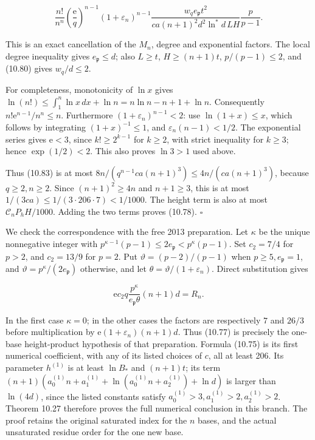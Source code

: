 \documentclass[
  11pt,
  a4paper,
]{article}
\begin{document}
\[
\frac{n!}{n^n}\left(\frac{\mathrm e}{q}\right)^{n-1}
(1+\varepsilon_n)^{n-1}
\frac{w_q e_{\mathfrak p}t^2}
{c a(n+1)^2d^2\ln^*d\,LH}\frac p{p-1}.
\tag{10.83}
\]

This is an exact cancellation of the \(M_n\), degree and exponential
factors. The local degree inequality gives \(e_{\mathfrak p}\le d\);
also \(L\ge t\), \(H\ge(n+1)t\), \(p/(p-1)\le2\), and (10.80) gives
\(w_q/d\le2\).

For completeness, monotonicity of \(\ln x\) gives
\(\ln(n!)\le\int_1^n\ln x\,dx+\ln n
=n\ln n-n+1+\ln n\). Consequently \(n!\mathrm e^{n-1}/n^n\le n\).
Furthermore \((1+\varepsilon_n)^{n-1}<2\): use \(\ln(1+x)\le x\), which
follows by integrating \((1+x)^{-1}\le1\), and
\(\varepsilon_n(n-1)<1/2\). The exponential series gives
\(\mathrm e<3\), since \(k!\ge2^{k-1}\) for \(k\ge2\), with strict
inequality for \(k\ge3\); hence \(\exp(1/2)<2\). This also proves
\(\ln3>1\) used above.

Thus (10.83) is at most \(8n/(q^{n-1}c a(n+1)^3)\le4n/(c a(n+1)^3)\),
because \(q\ge2,n\ge2\). Since \((n+1)^2\ge4n\) and \(n+1\ge3\), this is
at most \(1/(3ca)\le1/(3\cdot206\cdot7)<1/1000\). The height term is
also at most \(\mathcal C_nP_hH/1000\). Adding the two terms proves
(10.78). \(\square\)

We check the correspondence with the free 2013 preparation. Let
\(\kappa\) be the unique nonnegative integer with
\(p^{\kappa-1}(p-1)\le2e_{\mathfrak p}<p^\kappa(p-1)\). Set \(c_2=7/4\)
for \(p>2\), and \(c_2=13/9\) for \(p=2\). Put \(\vartheta=(p-2)/(p-1)\)
when \(p\ge5,e_{\mathfrak p}=1\), and
\(\vartheta=p^\kappa/(2e_{\mathfrak p})\) otherwise, and let
\(\theta=\vartheta/(1+\varepsilon_n)\). Direct substitution gives

\[
\mathrm e c_2q\frac{p^\kappa}{e_{\mathfrak p}\theta}(n+1)d=R_n.
\tag{10.84}
\]

In the first case \(\kappa=0\); in the other cases the factors are
respectively \(7\) and \(26/3\) before multiplication by
\(\mathrm e(1+\varepsilon_n)(n+1)d\). Thus (10.77) is precisely the
one-base height-product hypothesis of that preparation. Formula (10.75)
is its first numerical coefficient, with any of its listed choices of
\(c\), all at least 206. Its parameter \(h^{(1)}\) is at least
\(\ln B_*\) and \((n+1)t\); its term
\((n+1)(a_0^{(1)}n+a_1^{(1)}+\ln(a_0^{(1)}n+a_2^{(1)})+\ln d)\) is
larger than \(\ln(4d)\), since the listed constants satisfy
\(a_0^{(1)}>3,a_1^{(1)}>2,a_2^{(1)}>2\). Theorem 10.27 therefore proves
the full numerical conclusion in this branch. The proof retains the
original saturated index for the \(n\) bases, and the actual unsaturated
residue order for the one new base.
\end{document}
